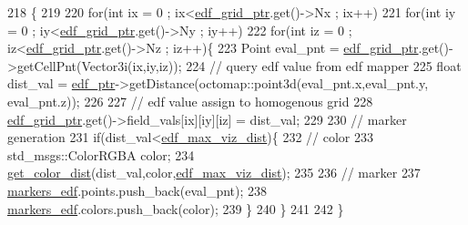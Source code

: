 \begin{DoxyCode}
218                                 \{
219 
220     \textcolor{keywordflow}{for}(\textcolor{keywordtype}{int} ix = 0 ; ix<\hyperlink{class_objects_handler_af2063609510d5ad8f136a275b0d127c1}{edf\_grid\_ptr}.get()->Nx ; ix++)
221         \textcolor{keywordflow}{for}(\textcolor{keywordtype}{int} iy = 0 ; iy<\hyperlink{class_objects_handler_af2063609510d5ad8f136a275b0d127c1}{edf\_grid\_ptr}.get()->Ny ; iy++)
222             \textcolor{keywordflow}{for}(\textcolor{keywordtype}{int} iz = 0 ; iz<\hyperlink{class_objects_handler_af2063609510d5ad8f136a275b0d127c1}{edf\_grid\_ptr}.get()->Nz ; iz++)\{
223                 Point eval\_pnt = \hyperlink{class_objects_handler_af2063609510d5ad8f136a275b0d127c1}{edf\_grid\_ptr}.get()->getCellPnt(Vector3i(ix,iy,iz));  
224                 \textcolor{comment}{// query edf value from edf mapper                       }
225                 \textcolor{keywordtype}{float} dist\_val = \hyperlink{class_objects_handler_aa96d8c71f5e8c6423c88d3302220d4cf}{edf\_ptr}->getDistance(octomap::point3d(eval\_pnt.x,eval\_pnt.y,
      eval\_pnt.z));
226 
227                 \textcolor{comment}{// edf value assign to homogenous grid  }
228                 \hyperlink{class_objects_handler_af2063609510d5ad8f136a275b0d127c1}{edf\_grid\_ptr}.get()->field\_vals[ix][iy][iz] = dist\_val;
229 
230                 \textcolor{comment}{// marker generation}
231                 \textcolor{keywordflow}{if}(dist\_val<\hyperlink{class_objects_handler_a577e8b62f1e55d36330048fb9fd3a432}{edf\_max\_viz\_dist})\{                
232                     \textcolor{comment}{// color }
233                     std\_msgs::ColorRGBA color;                    
234                     \hyperlink{_common_8h_a4b2e4b6698ff92678b23392dc111b36d}{get\_color\_dist}(dist\_val,color,\hyperlink{class_objects_handler_a577e8b62f1e55d36330048fb9fd3a432}{edf\_max\_viz\_dist});
235 
236                     \textcolor{comment}{// marker }
237                     \hyperlink{class_objects_handler_ad6904dcaaad790234569760df0fb0ac2}{markers\_edf}.points.push\_back(eval\_pnt);
238                     \hyperlink{class_objects_handler_ad6904dcaaad790234569760df0fb0ac2}{markers\_edf}.colors.push\_back(color);                    
239                 \}
240             \}    
241 
242 \}
\end{DoxyCode}
